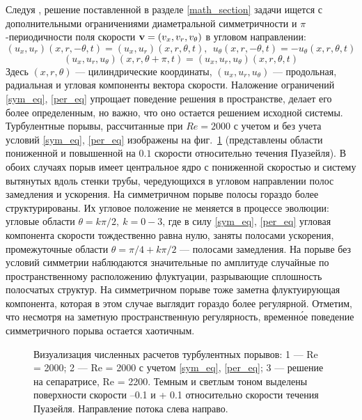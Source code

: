 Следуя \cite{Avila2013}, решение поставленной в разделе \ref{math_section} задачи ищется с дополнительными ограничениями диаметральной симметричности и $\pi$-периодичности поля скорости $\mathbf{v} = (v_x, v_r, v_\theta)$ в угловом направлении:
\begin{equation}\label{sym_eq}
(u_x,u_r)(x,r,-\theta,t)=(u_x,u_r)(x,r,\theta,t),\ \ u_\theta(x,r,-\theta,t)=-u_\theta(x,r,\theta,t)
\end{equation}
\begin{equation}\label{per_eq}
(u_x,u_r,u_\theta)(x,r,\theta+\pi,t) = (u_x,u_r,u_\theta)(x,r,\theta,t)
\end{equation}
Здесь $(x, r, \theta)$ --- цилиндрические координаты, $(u_x, u_r, u_\theta)$ --- продольная, радиальная и угловая компоненты вектора скорости. Наложение ограничений \eqref{sym_eq}, \eqref{per_eq} упрощает поведение решения в пространстве, делает его более определенным, но важно, что оно остается решением исходной системы. Турбулентные порывы, рассчитанные при $Re=2000$ с учетом и без учета условий \eqref{sym_eq}, \eqref{per_eq} изображены на фиг.~\ref{3D_img} (представлены области пониженной и повышенной на $0.1$ скорости относительно течения Пуазейля). В обоих случаях порыв имеет центральное ядро с пониженной скоростью и систему вытянутых вдоль стенки трубы, чередующихся в угловом направлении полос замедления и ускорения. На симметричном порыве полосы гораздо более структурированы. Их угловое положение не меняется в процессе эволюции: угловые области $\theta=k\pi/2,\ k=0-3$, где в силу \eqref{sym_eq}, \eqref{per_eq} угловая компонента скорости тождественно равна нулю, заняты полосами ускорения, промежуточные области $\theta=\pi/4+k\pi/2$ --- полосами замедления. На порыве без условий симметрии наблюдаются значительные по амплитуде случайные по пространственному расположению флуктуации, разрывающие сплошность полосчатых структур. На симметричном порыве тоже заметна флуктуирующая компонента, которая в этом случае выглядит гораздо более регулярной. Отметим, что несмотря на заметную пространственную регулярность, временн\'{о}е поведение симметричного порыва остается хаотичным.


\begin{figure}[h]
\caption{Визуализация численных расчетов турбулентных порывов: 1 --- Re = 2000; 2 --- Re = 2000 с учетом \eqref{sym_eq}, \eqref{per_eq}; 3 --- решение на сепаратрисе, Re = 2200. Темным и светлым тоном выделены поверхности скорости –0.1 и + 0.1 относительно скорости течения Пуазейля. Направление потока слева направо.}
\label{3D_img}
\end{figure}

